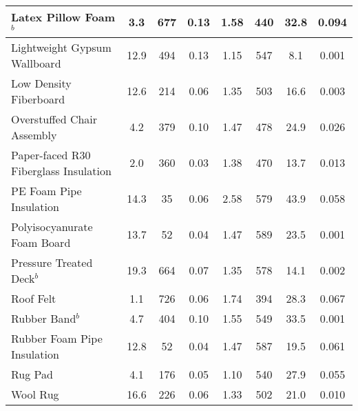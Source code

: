 \begin{table}[!h]
\begin{tabular}{|p{6.5cm}|c|c|c|c|c|c|c|}
Latex Pillow Foam$^{b}$                           & 3.3  & 677  & 0.13 & 1.58 & 440 & 32.8 & 0.094 \\\hline
Lightweight Gypsum Wallboard                      & 12.9 & 494  & 0.13 & 1.15 & 547 & 8.1  & 0.001 \\\hline
Low Density Fiberboard                            & 12.6 & 214  & 0.06 & 1.35 & 503 & 16.6 & 0.003 \\\hline
Overstuffed Chair Assembly                        & 4.2  & 379  & 0.10 & 1.47 & 478 & 24.9 & 0.026 \\\hline
Paper-faced R30 Fiberglass Insulation             & 2.0  & 360  & 0.03 & 1.38 & 470 & 13.7 & 0.013 \\\hline
PE Foam Pipe Insulation                           & 14.3 & 35   & 0.06 & 2.58 & 579 & 43.9 & 0.058 \\\hline
Polyisocyanurate Foam Board                       & 13.7 & 52   & 0.04 & 1.47 & 589 & 23.5 & 0.001 \\\hline
Pressure Treated Deck$^{b}$                       & 19.3 & 664  & 0.07 & 1.35 & 578 & 14.1 & 0.002 \\\hline
Roof Felt                                         & 1.1  & 726  & 0.06 & 1.74 & 394 & 28.3 & 0.067 \\\hline
Rubber Band$^{b}$                                 & 4.7  & 404  & 0.10 & 1.55 & 549 & 33.5 & 0.001 \\\hline
Rubber Foam Pipe Insulation                       & 12.8 & 52   & 0.04 & 1.47 & 587 & 19.5 & 0.061 \\\hline
Rug Pad                                           & 4.1  & 176  & 0.05 & 1.10 & 540 & 27.9 & 0.055 \\\hline
Wool Rug                                          & 16.6 & 226  & 0.06 & 1.33 & 502 & 21.0 & 0.010 \\\hline
\end{tabular}
\label{Properties_FSRI_Materials_Others}
\end{table}
\vspace{-0.4cm}
\\
\\


